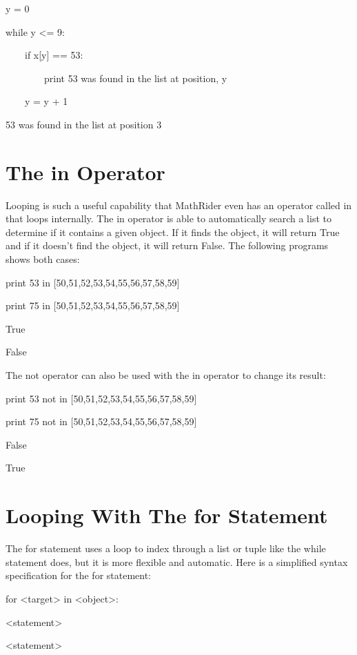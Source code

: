 \documentclass[12pt,oneside]{book}
\begin{document}
y = 0

while y {\textless}= 9:

\ \ \ \ if x[y] == 53:

\ \ \ \ \ \ \ \ print {\textquotedbl}53 was found in the list at position{\textquotedbl}, y

\ \ \ \ y = y + 1

{\textbar}

53 was found in the list at position 3

\section[The in Operator]{The in Operator}

Looping is such a useful capability that MathRider even has an operator called in that loops internally. The in operator is able to automatically search a list to determine if it contains a given object. If it finds the object, it will return True and if it doesn't find the object, it will return False. The following programs shows both cases: 


print 53 in [50,51,52,53,54,55,56,57,58,59]

print 75 in [50,51,52,53,54,55,56,57,58,59]

{\textbar}

True

False


The not operator can also be used with the in operator to change its result:


print 53 not in [50,51,52,53,54,55,56,57,58,59]

print 75 not in [50,51,52,53,54,55,56,57,58,59]

{\textbar}

False

True

\section[Looping With The for Statement]{Looping With The for Statement}

The for statement uses a loop to index through a list or tuple like the while statement does, but it is more flexible and automatic. Here is a simplified syntax specification for the for statement: 

for {\textless}target{\textgreater} in {\textless}object{\textgreater}:

 {\textless}statement{\textgreater}

 {\textless}statement{\textgreater}
\end{document}

